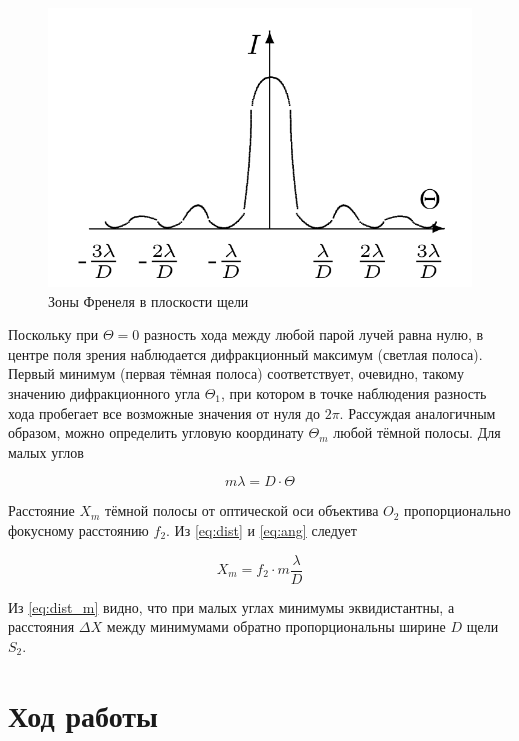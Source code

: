 \documentclass[a5paper,10pt, twoside]{article} %
\begin{document}
	\begin{figure} %
		\includegraphics[width=\linewidth]{dist.png}
		\caption{Зоны Френеля в	плоскости щели}
		\label{img:dist}
	\end{figure}

	Поскольку при $\Theta = 0$ разность хода между любой парой лучей равна нулю, в центре поля зрения
	наблюдается дифракционный максимум (светлая полоса). Первый минимум (первая тёмная полоса) 
	соответствует, очевидно, такому значению дифракционного угла $\Theta_1$, при котором
	в точке наблюдения разность хода пробегает все возможные значения от нуля до $2 \pi$.
	Рассуждая аналогичным образом, можно определить угловую координату $\Theta_m$
	любой тёмной полосы. Для малых углов

	\begin{equation}
		m \lambda = D \cdot \Theta
	\end{equation}\label{eq:ang}

	Расстояние $X_m$ тёмной полосы от оптической оси объектива $O_2$ пропорционально фокусному
	расстоянию $f_2$. Из \eqref{eq:dist} и \eqref{eq:ang} следует

	\begin{equation}
		X_m = f_2 \cdot m \frac{\lambda}{D}
	\end{equation}\label{eq:dist_m}

	Из \eqref{eq:dist_m} видно, что при малых углах минимумы эквидистантны, а расстояния $\Delta X$
	между минимумами обратно пропорциональны ширине $D$ щели $S_2$.

\section{Ход работы}
\end{document}
